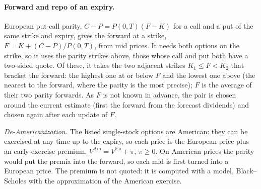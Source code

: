 \paragraph{Forward and repo of an expiry.} European put-call parity, $C - P = P(0,T)(F - K)$ for a call and a put
of the same strike and expiry, gives the forward at a strike, $F = K + (C - P)/P(0,T)$, from mid prices. It needs both
options on the strike, so it uses the parity strikes above, those whose call and put both have a two-sided quote.
Of these, it takes the two adjacent strikes
$K_1 \le F < K_2$ that bracket the forward: the highest one at or below $F$ and the lowest one above (the nearest to
the forward, where the parity is the most precise); $F$ is the average of their two parity forwards. As $F$ is not
known in advance, the pair is chosen around the current estimate (first the forward from the forecast dividends) and
chosen again after each update of $F$.

\emph{De-Americanization.} The listed single-stock options are American: they can be exercised at any time up to the
expiry, so each price is the European price plus an early-exercise premium, $V^{\mathrm{Am}} = V^{\mathrm{Eu}} + \pi$,
$\pi \ge 0$. On American prices the parity would put the premia into the forward, so each mid is first turned into a
European price. The premium is not quoted: it is computed with a model, Black--Scholes with the
\citet{bjerksund1993} approximation of the American exercise.


